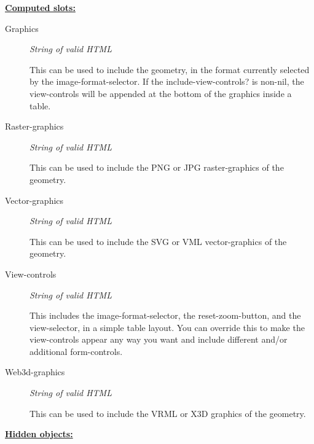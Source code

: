 \documentclass [11pt]{book}
\begin{document}
\begin{itemize}
\begin{description}
\end{description}






\textbf{
\underline{Computed slots:}}

\begin{description}

\item [Graphics]
\emph{String of valid HTML}

 This can be used to
include the geometry, in the format currently selected by the image-format-selector.
If the include-view-controls? is non-nil, the view-controls will be appended at the
bottom of the graphics inside a table.




\item [Raster-graphics]
\emph{String of valid HTML}

 This can be used to
include the PNG or JPG raster-graphics of the geometry.




\item [Vector-graphics]
\emph{String of valid HTML}

 This can be used to
include the SVG or VML vector-graphics of the geometry.




\item [View-controls]
\emph{String of valid HTML}

 This includes the image-format-selector, the reset-zoom-button,
and the view-selector, in a simple table layout. You can override this to make the view-controls
appear any way you want and include different and/or additional form-controls.




\item [Web3d-graphics]
\emph{String of valid HTML}

 This can be used to
include the VRML or X3D graphics of the geometry.




\end{description}






\textbf{
\underline{Hidden objects:}}


\end{itemize}
\end{document}
